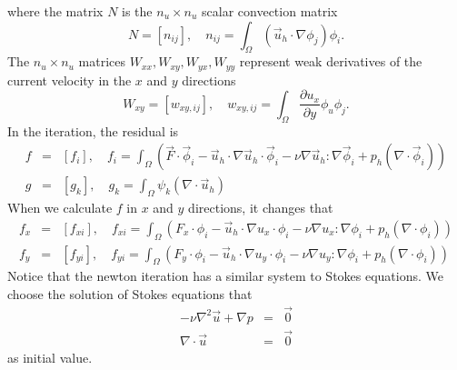 \documentclass[a4paper]{article}
\begin{document}
where the matrix $N$ is the $n_u\times n_u$ scalar convection matrix
\begin{equation}
N = [n_{ij}], \quad n_{ij} = \int_{\Omega} (\vec{u}_h\cdot \nabla\phi_j)\phi_i .
\label{mt::N}
\end{equation}
The $n_u\times n_u$ matrices $W_{xx}, W_{xy}, W_{yx}, W_{yy}$ represent weak derivatives of the current velocity in the $x$ and $y$ directions
\begin{equation}
W_{xy} = [w_{xy,ij}],\quad w_{xy,ij} = \int_{\Omega} \frac{\partial u_x}{\partial y}\phi_u \phi_j.
\label{mt::W}
\end{equation}
In the iteration, the residual is
\begin{equation}
\begin{array}{rcl}
f &=& [f_i],\quad f_i = \int_{\Omega}(\vec{F}\cdot\vec{\phi}_i-\vec{u}_h\cdot\nabla\vec{u}_h\cdot\vec{\phi}_i-\nu\nabla\vec{u}_h:\nabla\vec{\phi}_i+p_h(\nabla\cdot\vec{\phi}_i)) \\
g &=& [g_k],\quad g_k = \int_{\Omega}\psi_k(\nabla \cdot \vec{u}_h)
\end{array}
\end{equation}
When we calculate $f$ in $x$ and $y$ directions, it changes that
\begin{equation}
\begin{array}{rcl}
f_x &=& [f_{xi}],\quad f_{xi}=\int_{\Omega}(F_x\cdot\phi_i-\vec{u}_h\cdot\nabla u_x\cdot\phi_i-\nu\nabla u_x:\nabla\phi_i+p_h(\nabla\cdot\phi_i)) \\
f_y &=& [f_{yi}],\quad f_{yi}=\int_{\Omega}(F_y\cdot\phi_i-\vec{u}_h\cdot\nabla u_y\cdot\phi_i-\nu\nabla u_y:\nabla\phi_i+p_h(\nabla\cdot\phi_i))
\label{mt::f}
\end{array}
\end{equation}
Notice that the newton iteration has a similar system to Stokes equations. We choose the solution of Stokes equations that
\begin{equation}
\begin{array}{rcl}
-\nu\nabla^2 \vec{u} + \nabla p &=& \vec{0} \\
\nabla \cdot \vec{u} &=& \vec{0}
\label{eq::nuStokes-problem}
\end{array}
\end{equation}
as initial value.
\end{document}
